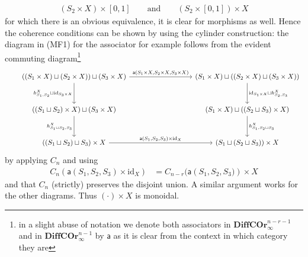 \begin{prf}[Sketch]
\begin{enumerate}
\begin{align*}
  \left(
    S_{2}
    \times
    X
  \right)
  \times
  [0,1]
  \qquad
  \text{and}
  \qquad
  \left(
    S_{2}
    \times
    [0,1]
  \right)
  \times
  X
\end{align*}
for which there is an obvious equivalence, it is clear for morphisms as well. Hence the coherence conditions can be shown by using the cylinder construction: the diagram in (MF1) for the associator for example follows from the evident commuting diagram\footnote{in a slight abuse of notation we denote both associators in $\mathbf{DiffCOr}_{\infty}^{n - r - 1}$ and in $\mathbf{DiffCOr}_{\infty}^{n - 1}$ by $\mathsf{a}$ as it is clear from the context in which category they are}
\begin{equation*}
\hspace{2em}
\begin{tikzcd}[row sep=3em, column sep=9em]
  ((S_{1} \times X) \sqcup (S_{2} \times X))
  \sqcup
  (S_{3} \times X)
  \arrow{r}{\mathsf{a}(S_{1} \times X,S_{2} \times X,S_{3} \times X)}
  \arrow[swap]{d}{h_{S_{1},S_{2}}^{X} \sqcup \mathrm{id}_{S_{3} \times X}}
  &
  (S_{1} \times X)
  \sqcup
  ((S_{2} \times X) \sqcup (S_{3} \times X))
  \arrow{d}{\mathrm{id}_{S_{1} \times X} \sqcup h_{S_{2},S_{3}}^{X}}
  \\
  ((S_{1} \sqcup S_{2}) \times X)
  \sqcup
  (S_{3} \times X)
  \arrow[swap]{d}{h_{S_{1} \sqcup S_{2},S_{3}}^{X}}
  &
  (S_{1} \times X)
  \sqcup
  ((S_{2} \sqcup S_{3}) \times X)
  \arrow{d}{h_{S_{1},S_{2} \sqcup S_{3}}^{X}}
  \\
  \left(
    (S_{1} \sqcup S_{2})
    \sqcup
    S_{3}
  \right)
  \times
  X
  \arrow{r}{\mathsf{a}(S_{1},S_{2},S_{3}) \times \mathrm{id}_{X}}
  &
  \left(
    S_{1}
    \sqcup
    (S_{2} \sqcup S_{3})
  \right)
  \times
  X
\end{tikzcd}
\end{equation*}
by applying $C_{n}$ and using
\begin{align*}
  C_{n}
  \left(
    \mathsf{a}
    \left(
      S_{1}
      ,
      S_{2}
      ,
      S_{3}
    \right)
    \times
    \mathrm{id}_{X}
  \right)
  &=
  C_{n - r}(\mathsf{a}
  \left(
    S_{1}
    ,
    S_{2}
    ,
    S_{3})
  \right)
  \times
  X
\end{align*}
and that $C_{n}$ (strictly) preserves the disjoint union. A similar argument works for the other diagrams. Thus $(\cdot) \times X$ is monoidal.


\end{enumerate}
\end{prf}
